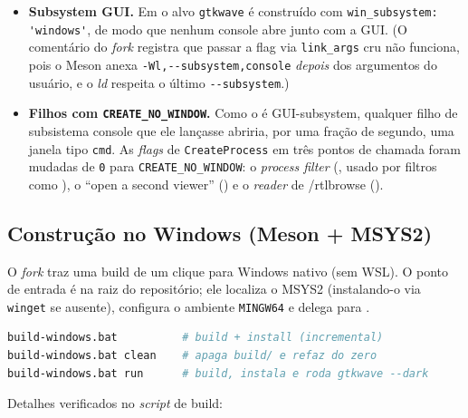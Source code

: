 \begin{itemize}
  \item \textbf{Subsystem GUI.} Em  o alvo \lstinline|gtkwave|
        é construído com \lstinline|win_subsystem: 'windows'|, de modo que nenhum
        console abre junto com a GUI. (O comentário do \emph{fork} registra que
        passar a flag via \lstinline|link_args| cru não funciona, pois o Meson
        anexa \lstinline|-Wl,--subsystem,console| \emph{depois} dos argumentos do
        usuário, e o \emph{ld} respeita o último \lstinline|--subsystem|.)
  \item \textbf{Filhos com \lstinline|CREATE_NO_WINDOW|.} Como o
         é GUI-subsystem, qualquer filho de subsistema console
        que ele lançasse abriria, por uma fração de segundo, uma janela tipo
        \lstinline|cmd|. As \emph{flags} de \lstinline|CreateProcess| em três
        pontos de chamada foram mudadas de \lstinline|0| para
        \lstinline|CREATE_NO_WINDOW|: o \emph{process filter}
        (, usado por filtros como ), o
        \enquote{open a second viewer} () e o \emph{reader} de
        /rtlbrowse ().
\end{itemize}

\subsection{Construção no Windows (Meson + MSYS2)}
\label{sec:cap10-gtkwave-build}

O \emph{fork} traz uma build de um clique para Windows nativo (sem WSL). O ponto de
entrada é  na raiz do repositório; ele localiza o MSYS2
(instalando-o via \lstinline|winget| se ausente), configura o ambiente
\lstinline|MINGW64| e delega para .

\begin{lstlisting}[language=bash,caption={Uso do build-windows.bat (do README do fork).}]
build-windows.bat          # build + install (incremental)
build-windows.bat clean    # apaga build/ e refaz do zero
build-windows.bat run      # build, instala e roda gtkwave --dark
\end{lstlisting}

Detalhes verificados no \emph{script} de build:

